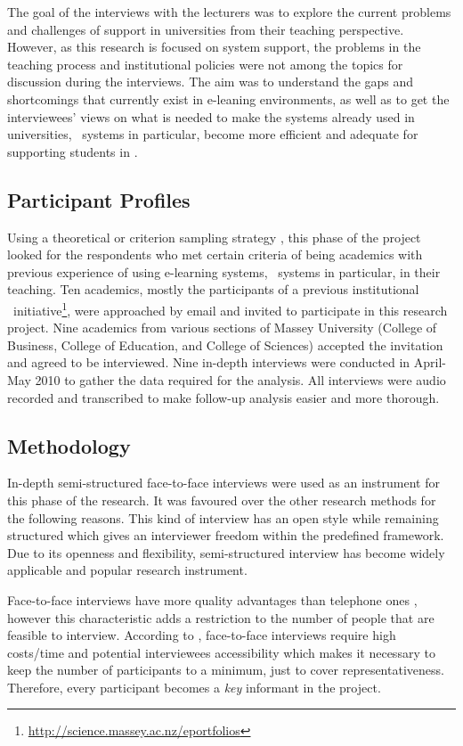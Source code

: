 The goal of the interviews with the lecturers was to explore the current
problems and challenges of \LLLs support in universities from their teaching
perspective. However, as this research is focused on system support, the
problems in the teaching process and institutional policies were not among the
topics for discussion during the interviews. The aim was to understand the gaps
and shortcomings that currently exist in e-leaning environments, as well as to
get the interviewees' views on what is needed to make the systems already used
in universities, \ep~systems in particular, become more efficient and adequate
for supporting students in \LLLsn. 

\subsection{Participant Profiles}
Using a theoretical or criterion sampling strategy \citep{Byrne2001,
Warren2001}, this phase of the project looked for the respondents who met
certain criteria of being academics with previous experience of using
e-learning systems, \ep~systems in particular, in their teaching. Ten academics,
mostly the participants of a previous institutional
\ep~initiative\footnote{\url{http://science.massey.ac.nz/eportfolios}}, were
approached by email and invited to participate in this research project. Nine
academics from various sections of Massey University (College of Business,
College of Education, and College of Sciences) accepted the invitation and
agreed to be interviewed. Nine in-depth interviews were conducted in April-May
2010 to gather the data required for the analysis. All interviews were audio
recorded and transcribed to make follow-up analysis easier and more thorough.

\subsection{Methodology}

In-depth semi-structured face-to-face interviews were used as an instrument for
this phase of the research. It was favoured over the other research methods for
the following reasons. This kind of interview has an open style while remaining
structured \citep{Gillham2000} which gives an interviewer freedom within the
predefined framework. Due to its openness and flexibility, semi-structured
interview has become widely applicable and popular research instrument.

Face-to-face interviews have more quality advantages than telephone ones
\citep{Shuy2001}, however this characteristic adds a restriction to the number
of people that are feasible to interview. According to \citet{Gillham2000},
face-to-face interviews require high costs/time and potential interviewees
accessibility which makes it necessary to keep the number of participants to a
minimum, just to cover representativeness. Therefore, every participant becomes
a \textit{key} informant in the project.

